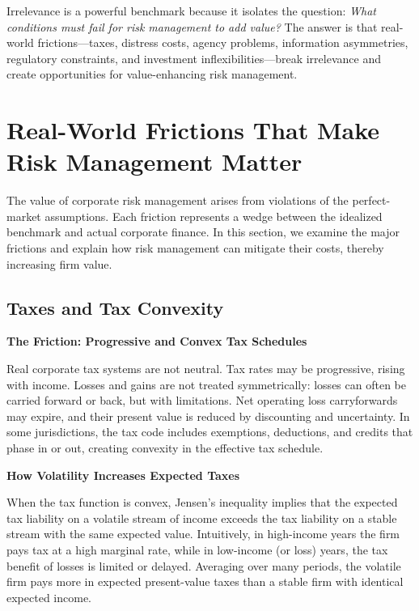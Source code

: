 \documentclass[11pt,openany]{book}
\begin{document}
Irrelevance is a powerful benchmark because it isolates the question: \emph{What conditions must fail for risk management to add value?} The answer is that real-world frictions---taxes, distress costs, agency problems, information asymmetries, regulatory constraints, and investment inflexibilities---break irrelevance and create opportunities for value-enhancing risk management.


\section{Real-World Frictions That Make Risk Management Matter}\label{real-world-frictions-that-make-risk-management-matter}

The value of corporate risk management arises from violations of the perfect-market assumptions. Each friction represents a wedge between the idealized benchmark and actual corporate finance. In this section, we examine the major frictions and explain how risk management can mitigate their costs, thereby increasing firm value.

\subsection{Taxes and Tax Convexity}\label{taxes-and-tax-convexity}

\textbf{The Friction: Progressive and Convex Tax Schedules}

Real corporate tax systems are not neutral. Tax rates may be progressive, rising with income. Losses and gains are not treated symmetrically: losses can often be carried forward or back, but with limitations. Net operating loss carryforwards may expire, and their present value is reduced by discounting and uncertainty. In some jurisdictions, the tax code includes exemptions, deductions, and credits that phase in or out, creating convexity in the effective tax schedule.

\textbf{How Volatility Increases Expected Taxes}

When the tax function is convex, Jensen's inequality implies that the expected tax liability on a volatile stream of income exceeds the tax liability on a stable stream with the same expected value. Intuitively, in high-income years the firm pays tax at a high marginal rate, while in low-income (or loss) years, the tax benefit of losses is limited or delayed. Averaging over many periods, the volatile firm pays more in expected present-value taxes than a stable firm with identical expected income.
\end{document}
